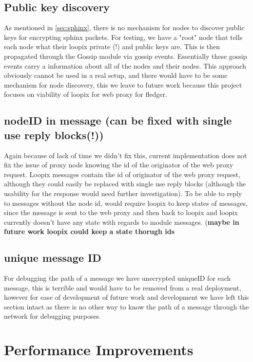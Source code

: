 \documentclass[a4paper,11pt,oneside]{report}
\begin{document}
\subsection{Public key discovery}
As mentioned in \autoref{sec:sphinx}, there is no mechanism for nodes to discover public keys for encrypting sphinx packets. For testing, we have a "root" node that tells each node what their loopix private (!) and public keys are. This is then propagated through the Gossip module via gossip events. Essentially these gossip events carry a information about all of the nodes and their nodes. This approach obviously cannot be used in a real setup, and there would have to be some mechanism for node discovery, this we leave to future work because this project focuses on viability of loopix for web proxy for fledger.

\subsection{ nodeID in message (can be fixed with single use reply blocks(!))}
Again because of lack of time we didn't fix this, current implementation does not fix the issue of proxy node knowing the id of the originator of the web proxy request. Loopix messages contain the id of originator of the web proxy request, although they could easily be replaced with single use reply blocks (although the usability for the response would need further investigation). To be able to reply to messages without the node id, would require loopix to keep states of messages, since the message is sent to the web proxy and then back to loopix and loopix currently doesn't have any state with regards to module messages. (\textbf{maybe in future work loopix could keep a state thorugh ids}

\subsection{ unique message ID}
For debugging the path of a message we have unecrypted uniqueID for each message, this is terrible and would have to be removed from a real deployment, however for ease of development of future work and development we have left this section intact as there is no other way to know the path of a message through the network for debugging purposes.

\section{Performance Improvements}
\end{document}
